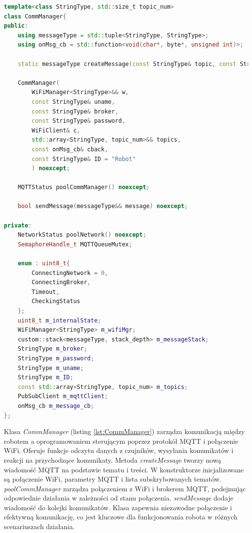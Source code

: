 \documentclass[12pt,twoside]{article}
\begin{document}
\begin{lstlisting}[language=C++, caption={Klasa CommManager}, label={lst:CommManager}]
template<class StringType, std::size_t topic_num>
class CommManager{
public:
    using messageType = std::tuple<StringType, StringType>;
    using onMsg_cb = std::function<void(char*, byte*, unsigned int)>;

    static messageType createMessage(const StringType& topic, const StringType& payload) noexcept;

    CommManager(
        WiFiManager<StringType>&& w, 
        const StringType& uname, 
        const StringType& broker, 
        const StringType& password, 
        WiFiClient& c, 
        std::array<StringType, topic_num>&& topics,
        const onMsg_cb& cback,
        const StringType& ID = "Robot"
        ) noexcept;

    MQTTStatus poolCommManager() noexcept;
    
    bool sendMessage(messageType&& message) noexcept;

private:
    NetworkStatus poolNetwork() noexcept;
    SemaphoreHandle_t MQTTQueueMutex;

    enum : uint8_t{
        ConnectingNetwork = 0,
        ConnectingBroker,
        Timeout,
        CheckingStatus
    };
    uint8_t m_internalState;
    WiFiManager<StringType> m_wifiMgr;
    custom::stack<messageType, stack_depth> m_messageStack;
    StringType m_broker;
    StringType m_password;
    StringType m_uname;
    StringType m_ID;
    const std::array<StringType, topic_num> m_topics;
    PubSubClient m_mqttClient;
    onMsg_cb m_message_cb;
};
\end{lstlisting}

Klasa \textit{CommManager} (listing \ref{lst:CommManager}) zarządza komunikacją między robotem a oprogramowaniem sterującym poprzez protokół MQTT i połączenie WiFi. Oferuje funkcje odczytu danych z czujników, wysyłania komunikatów i reakcji na przychodzące komunikaty. Metoda \textit{createMessage} tworzy nową wiadomość MQTT na podstawie tematu i treści. W konstruktorze inicjalizowane są połączenie WiFi, parametry MQTT i lista subskrybowanych tematów. \textit{poolCommManager} zarządza połączeniem z WiFi i brokerem MQTT, podejmując odpowiednie działania w zależności od stanu połączenia. \textit{sendMessage} dodaje wiadomość do kolejki komunikatów. Klasa zapewnia niezawodne połączenie i efektywną komunikację, co jest kluczowe dla funkcjonowania robota w różnych scenariuszach działania.
\end{document}
